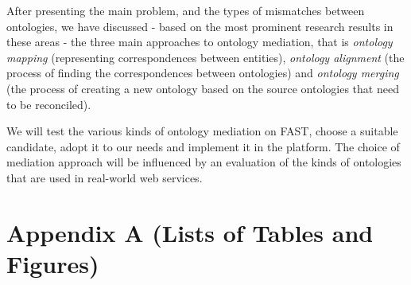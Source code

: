 \documentclass{fast_latex}
\begin{document}
After presenting the main problem, and the types of mismatches between
ontologies, we have discussed - based on the most prominent research
results in these areas - the three main approaches to ontology
mediation, that is \textit{ontology mapping} (representing
correspondences between entities), \textit{ontology alignment} (the
process of finding the correspondences between ontologies) and
\textit{ontology merging }(the process of creating a new ontology based
on the source ontologies that need to be reconciled). 

We will test the various kinds of ontology mediation on FAST, choose a
suitable candidate, adopt it to our needs and implement it in the
platform. The choice of mediation approach will be influenced by an
evaluation of the kinds of ontologies that are used in real-world web
services. 

\clearpage



\clearpage
\doublespacing
\section*{Appendix A (Lists of Tables and Figures)}

\listoftables

\listoffigures
\end{document}
